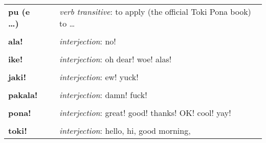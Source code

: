 \begin{supertabular}{p{2,5cm}|ll}
    \textbf{pu (e \dots)}    &  & \textit{verb transitive}: to apply (the official Toki Pona book) to \dots           \\
                             &  &                                                                                     \\ %
    \textbf{ala!}            &  & \textit{interjection}: no!                                                          \\ %
                             &  &                                                                                     \\ %
    \textbf{ike!}            &  & \textit{interjection}: oh dear! woe! alas!                                          \\ %
                             &  &                                                                                     \\ %
    \textbf{jaki!}           &  & \textit{interjection}: ew! yuck!                                                    \\ %
                             &  &                                                                                     \\ %
    \textbf{pakala!}         &  & \textit{interjection}: damn! fuck!                                                  \\ %
                             &  &                                                                                     \\ %
    \textbf{pona!}           &  & \textit{interjection}: great! good! thanks! OK! cool! yay!                          \\ %
                             &  &                                                                                     \\ %
    \textbf{toki!}           &  & \textit{interjection}: hello, hi, good morning,                                     \\ %
\end{supertabular} \\
%
%


